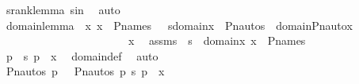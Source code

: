 \begin{isabellebody}
\ srank{\isacharunderscore}{\kern0pt}lemma\ sin\ \isamarkupfalse%
\ auto\ \isanewline
\isanewline
\ \ \ \ \ \ \ \ \isamarkupfalse%
\ domain{\isacharunderscore}{\kern0pt}lemma\ {\isacharcolon}{\kern0pt}\ {\isachardoublequoteopen}{\isasymAnd}x{\isachardot}{\kern0pt}\ x\ {\isasymin}\ P{\isacharunderscore}{\kern0pt}names\ {\isasymLongrightarrow}\ \ s{\isasymin}domain{\isacharparenleft}{\kern0pt}x{\isacharparenright}{\kern0pt}\ {\isasymLongrightarrow}\ Pn{\isacharunderscore}{\kern0pt}auto{\isacharparenleft}{\kern0pt}{\isasympi}{\isacharparenright}{\kern0pt}{\isacharbackquote}{\kern0pt}s\ {\isasymin}\ domain{\isacharparenleft}{\kern0pt}Pn{\isacharunderscore}{\kern0pt}auto{\isacharparenleft}{\kern0pt}{\isasympi}{\isacharparenright}{\kern0pt}{\isacharbackquote}{\kern0pt}x{\isacharparenright}{\kern0pt}{\isachardoublequoteclose}\ \isanewline
\ \ \ \ \ \ \ \ \isamarkupfalse%
\ {\isacharminus}{\kern0pt}\ \isanewline
\ \ \ \ \ \ \ \ \ \ \isamarkupfalse%
\ x\ \isamarkupfalse%
\ assms\ {\isacharcolon}{\kern0pt}\ {\isachardoublequoteopen}s\ {\isasymin}\ domain{\isacharparenleft}{\kern0pt}x{\isacharparenright}{\kern0pt}{\isachardoublequoteclose}\ {\isachardoublequoteopen}x\ {\isasymin}\ P{\isacharunderscore}{\kern0pt}names{\isachardoublequoteclose}\ \isanewline
\ \ \ \ \ \ \ \ \ \ \isamarkupfalse%
\ \isamarkupfalse%
\ p\ \ {\isachardoublequoteopen}{\isacharless}{\kern0pt}s{\isacharcomma}{\kern0pt}\ p{\isachargreater}{\kern0pt}\ {\isasymin}\ x{\isachardoublequoteclose}\ \isamarkupfalse%
\ domain{\isacharunderscore}{\kern0pt}def\ \isamarkupfalse%
\ auto\ \isanewline
\ \ \ \ \ \ \ \ \ \ \isamarkupfalse%
\ \isamarkupfalse%
\ {\isachardoublequoteopen}{\isacharless}{\kern0pt}Pn{\isacharunderscore}{\kern0pt}auto{\isacharparenleft}{\kern0pt}{\isasympi}{\isacharparenright}{\kern0pt}{\isacharbackquote}{\kern0pt}s{\isacharcomma}{\kern0pt}\ {\isasympi}{\isacharbackquote}{\kern0pt}p{\isachargreater}{\kern0pt}\ {\isasymin}\ {\isacharbraceleft}{\kern0pt}\ {\isacharless}{\kern0pt}Pn{\isacharunderscore}{\kern0pt}auto{\isacharparenleft}{\kern0pt}{\isasympi}{\isacharparenright}{\kern0pt}{\isacharbackquote}{\kern0pt}s{\isacharcomma}{\kern0pt}\ {\isasympi}{\isacharbackquote}{\kern0pt}p{\isachargreater}{\kern0pt}{\isachardot}{\kern0pt}\ {\isacharless}{\kern0pt}s{\isacharcomma}{\kern0pt}\ p{\isachargreater}{\kern0pt}\ {\isasymin}\ x\ {\isacharbraceright}{\kern0pt}{\isachardoublequoteclose}\ \isanewline

\end{isabellebody}
